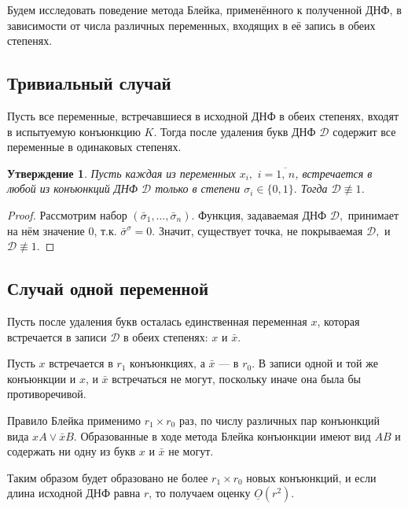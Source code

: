 \documentclass[12pt,a4paper,oneside,fleqn,leqno]{article}
\newtheorem{statement}{Утверждение}
\theoremstyle{definition}
\begin{document}
		Будем исследовать поведение метода Блейка, применённого к полученной ДНФ, в зависимости от числа различных переменных, входящих в её запись в обеих степенях.\par
		\subsection{Тривиальный случай}
			Пусть все переменные, встречавшиеся в исходной ДНФ в обеих степенях, входят в испытуемую конъюнкцию $K.$ Тогда после удаления букв ДНФ $\mathcal{D}$ содержит все переменные в одинаковых степенях.\par
			\begin{statement}
				Пусть каждая из переменных $x_i,\,\,i = \overline{1,\,n}$, встречается в любой из конъюнкций ДНФ $\mathcal{D}$ только в степени $\sigma_i \in \{ 0, 1\}.$ Тогда $\mathcal{D} \not\equiv 1$.
			\end{statement}
			\begin{proof}
				Рассмотрим набор $(\bar{\sigma}_1, \ldots, \bar{\sigma}_n).$ Функция, задаваемая ДНФ $\mathcal{D},$ принимает на нём значение 0, т.к. $\bar{\sigma}^{\sigma} = 0.$ Значит, существует точка, не покрываемая $\mathcal{D},$ и $\mathcal{D} \not\equiv 1$.
			\end{proof}
		\subsection{Случай одной переменной}
			Пусть после удаления букв осталась единственная переменная $x$, которая встречается в записи $\mathcal{D}$ в обеих степенях: $x$ и $\bar{x}$.\par
			Пусть $x$ встречается в $r_1$ конъюнкциях, а $\bar{x}$ --- в $r_0.$ В записи одной и той же конъюнкции и $x$, и $\bar{x}$ встречаться не могут, поскольку иначе она была бы противоречивой.\par
			Правило Блейка применимо $r_1\times r_0$ раз, по числу различных пар конъюнкций вида $xA \vee \bar{x}B.$ Образованные в ходе метода Блейка конъюнкции имеют вид $AB$ и содержать ни одну из букв $x$ и $\bar{x}$ не могут.\par
			Таким образом будет образовано не более $r_1\times r_0$ новых конъюнкций, и если длина исходной ДНФ равна $r$, то получаем оценку $\underline{O}(r^2).$
\end{document}
